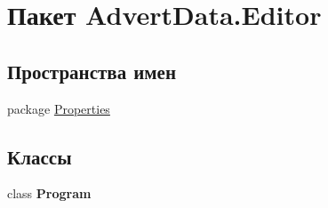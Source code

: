 \hypertarget{namespace_advert_data_1_1_editor}{\section{Пакет Advert\+Data.\+Editor}
\label{namespace_advert_data_1_1_editor}
}
\subsection*{Пространства имен}
\begin{DoxyCompactItemize}
\item 
package \hyperlink{namespace_advert_data_1_1_editor_1_1_properties}{Properties}
\end{DoxyCompactItemize}
\subsection*{Классы}
\begin{DoxyCompactItemize}
\item 
class {\bfseries Program}
\end{DoxyCompactItemize}
